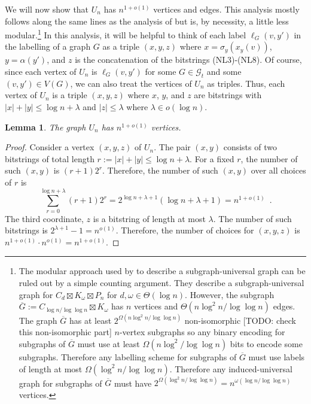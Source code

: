 \documentclass{patmorin}
\newtheorem{lemma}{Lemma}
\begin{document}
We will now show that $U_n$ has $n^{1+o(1)}$ vertices and edges.  This analysis mostly follows along the same lines as the analysis of \citet{esperet.joret.ea:sparse} but is, by necessity, a little less modular.\footnote{The modular approach used by \citet{esperet.joret.ea:sparse} to describe a subgraph-universal graph can be ruled out by a simple counting argument.  They describe a subgraph-universal graph for $C_d\boxtimes K_\omega\boxtimes P_n$ for $d,\omega\in\Theta(\log n)$.  However, the subgraph $\overline{G}:=C_{\log n/\log\log n}\boxtimes K_\omega$ has $n$ vertices and $\Theta(n\log^2 n/\log\log n)$ edges.  The graph $\overline{G}$ has at least $2^{\Omega(n\log^2 n/\log\log n)}$ non-isomorphic [TODO: check this non-isomorphic part] $n$-vertex subgraphs so any binary encoding for subgraphs of $\overline{G}$ must use at least $\Omega(n\log^2/\log\log n)$ bits to encode some subgraphs.  Therefore any labelling scheme for subgraphs of $\overline{G}$ must use labels of length at most $\Omega(\log^2 n/\log\log n)$.  Therefore any induced-universal graph for subgraphs of $\overline{G}$ must have $2^{\Omega(\log^2 n/\log\log n)}=n^{\omega(\log n/\log\log n)}$ vertices.}
In this analysis, it will be helpful to think of each label $\ell_G(v,y')$ in the labelling of a graph $G$ as a triple $(x,y,z)$ where $x=\sigma_y(x_y(v))$, $y=\alpha(y')$, and $z$ is the concatenation of the bitstrings (NL3)-(NL8). Of course, since each vertex of $U_n$ is $\ell_G(v,y')$ for some $G\in\mathcal{G}_t$ and some $(v,y')\in V(G)$, we can also treat the vertices of $U_n$ as triples.  Thus, each vertex of $U_n$ is a triple $(x,y,z)$ where $x$, $y$, and $z$ are bitstrings with  $|x|+|y|\le \log n + \lambda$ and $|z|\le \lambda$ where $\lambda\in o(\log n)$.

\begin{lemma}\label{vertex-count}
    The graph $U_n$ has $n^{1+o(1)}$ vertices.
\end{lemma}

\begin{proof}
    Consider a vertex $(x,y,z)$ of $U_n$. The pair $(x,y)$ consists of two bitstrings of total length $r := |x|+|y|\le\log n + \lambda$.  For a fixed $r$, the number of such $(x,y)$ is $(r+1)2^{r}$. Therefore, the number of such $(x,y)$ over all choices of $r$ is
    \[
        \sum_{r=0}^{\log n + \lambda} (r+1)2^r = 2^{\log n + \lambda+1}(\log n+\lambda + 1) = n^{1+o(1)} \enspace .
    \]
    The third coordinate, $z$ is a bitstring of length at most $\lambda$. The number of such bitstrings is $2^{\lambda+1}-1=n^{o(1)}$.  Therefore, the number of choices for $(x,y,z)$ is $n^{1+o(1)}\cdot n^{o(1)}=n^{1+o(1)}$.
\end{proof}
\end{document}
